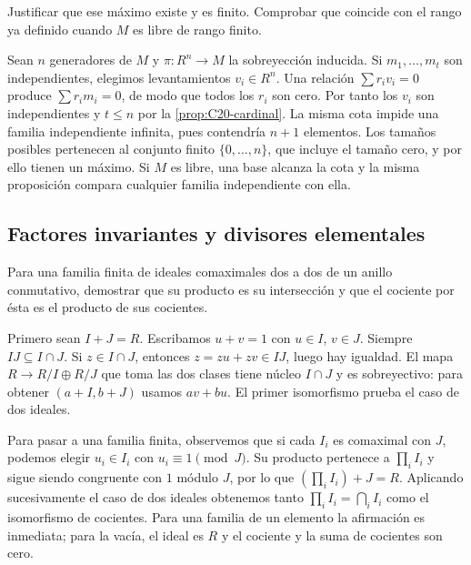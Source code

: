 \begin{ejer}[Remisión a VI.5.6]\label{ejer:C21-rango-finito}
Justificar que ese máximo existe y es finito. Comprobar que coincide con el rango ya definido cuando $M$ es libre de rango finito.
\end{ejer}
\begin{sol}
Sean $n$ generadores de $M$ y $\pi:R^n\to M$ la sobreyección inducida. Si $m_1,\ldots,m_t$ son independientes, elegimos levantamientos $v_i\in R^n$. Una relación $\sum r_iv_i=0$ produce $\sum r_im_i=0$, de modo que todos los $r_i$ son cero. Por tanto los $v_i$ son independientes y $t\leq n$ por la \cref{prop:C20-cardinal}. La misma cota impide una familia independiente infinita, pues contendría $n+1$ elementos. Los tamaños posibles pertenecen al conjunto finito $\{0,\ldots,n\}$, que incluye el tamaño cero, y por ello tienen un máximo. Si $M$ es libre, una base alcanza la cota y la misma proposición compara cualquier familia independiente con ella.
\end{sol}

\subsection{Factores invariantes y divisores elementales}
\begin{ejer}\label{ejer:C21-chino}
Para una familia finita de ideales comaximales dos a dos de un anillo conmutativo, demostrar que su producto es su intersección y que el cociente por ésta es el producto de sus cocientes.
\end{ejer}
\begin{sol}
Primero sean $I+J=R$. Escribamos $u+v=1$ con $u\in I$, $v\in J$. Siempre $IJ\subseteq I\cap J$. Si $z\in I\cap J$, entonces $z=zu+zv\in IJ$, luego hay igualdad. El mapa $R\to R/I\oplus R/J$ que toma las dos clases tiene núcleo $I\cap J$ y es sobreyectivo: para obtener $(a+I,b+J)$ usamos $av+bu$. El primer isomorfismo prueba el caso de dos ideales.

Para pasar a una familia finita, observemos que si cada $I_i$ es comaximal con $J$, podemos elegir $u_i\in I_i$ con $u_i\equiv1\pmod J$. Su producto pertenece a $\prod_iI_i$ y sigue siendo congruente con $1$ módulo $J$, por lo que $(\prod_iI_i)+J=R$. Aplicando sucesivamente el caso de dos ideales obtenemos tanto $\prod_iI_i=\bigcap_iI_i$ como el isomorfismo de cocientes. Para una familia de un elemento la afirmación es inmediata; para la vacía, el ideal es $R$ y el cociente y la suma de cocientes son cero.
\end{sol}

